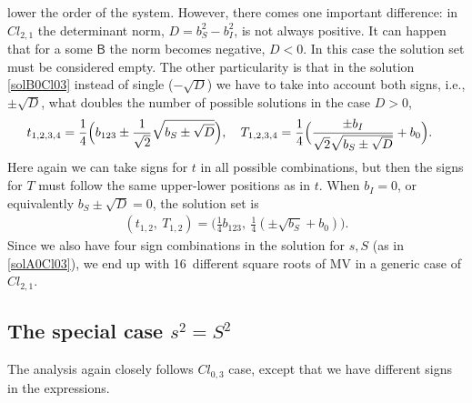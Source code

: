 \documentclass{birkjour}
\newcommand{\cl}[2]{\ensuremath{\mathit{Cl}_{#1,#2}}}
\def\B{\mathsf{B}}
\begin{document}
  lower the order of the system. However, there comes one
important difference: in \cl{2}{1} the determinant norm,
$D=b_S^2-b_I^2$, is not always positive. It can happen that for a
some $\B$ the norm becomes negative, $D<0$. In this case the
solution set must be considered empty. The other particularity is
that in the solution \eqref{solB0Cl03} instead of single
($-\sqrt{D}$) we have to take into account both signs, i.e.,
$\pm\sqrt{D}$, what doubles the number of possible solutions in the
case $D>0$,
\begin{equation}\label{solB0Cl21}
\begin{split}
&t_{1,2,3,4}=\frac{1}{4} \Bigl(b_{123} \pm
\frac{1}{\sqrt{2}}\sqrt{b_{S}\pm\sqrt{D}}\Bigr),\quad
T_{1,2,3,4}=\frac{1}{4}\Bigl(\frac{\pm
b_{I}}{\sqrt{2}\sqrt{b_{S}\pm\sqrt{D}}}+ b_{0}\Bigr).
\end{split}
\end{equation}
Here again we can take signs for $t$ in all possible combinations,
but then the signs for $T$ must follow the same upper-lower
positions as in  $t$. When  $b_{I}=0$, or equivalently
$b_{S}\pm\sqrt{D} = 0$, the solution set is
\begin{equation}\label{solB0d01aCl21}
\begin{split}
(t_{1,2},\ T_{1,2})= \bigl(\tfrac{1}{4}b_{123},\ \tfrac{1}{4}
(\pm\sqrt{b_{S}}+b_{0})\bigr).
\end{split}
\end{equation}
Since we also have four sign combinations in the solution for
$s,S$ (as in \eqref{solA0Cl03}), we end up with 16~different
square roots of MV in a generic case of \cl{2}{1}.

\subsection{The special case $s^2 = S^2$}

The analysis again closely follows \cl{0}{3} case, except that we
have different signs in the expressions.
\end{document}
